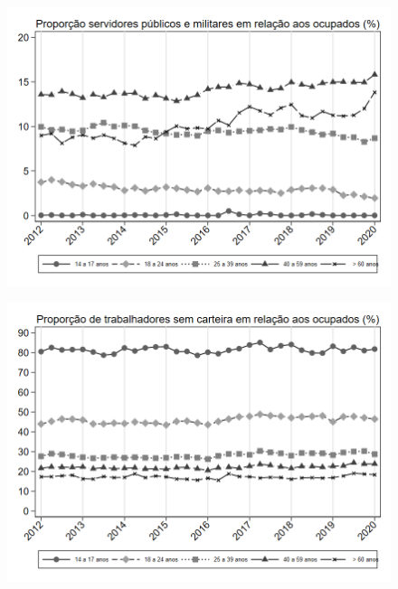 \begin{frame}[label=_composicao_demografica_faixa_etaria_prop_militar]{}
\textit{\hyperlink{_composicao_demografica_faixa_etaria}{}}
\begin{figure}
  \centering
  \includegraphics[width=1.0\linewidth]{../../analysis/output/composicao_demografica/faixa_etaria/_composicao_demografica_faixa_etaria_prop_militar.png}
  \caption{}
  \label{fig:_composicao_demografica_faixa_etaria_prop_militar}
\end{figure}
\end{frame}


\begin{frame}[label=_composicao_demografica_faixa_etaria_prop_empregadoSC]{}
\textit{\hyperlink{_composicao_demografica_faixa_etaria}{}}
\begin{figure}
  \centering
  \includegraphics[width=1.0\linewidth]{../../analysis/output/composicao_demografica/faixa_etaria/_composicao_demografica_faixa_etaria_prop_empregadoSC.png}
  \caption{}
  \label{fig:_composicao_demografica_faixa_etaria_prop_empregadoSC}
\end{figure}
\end{frame}


